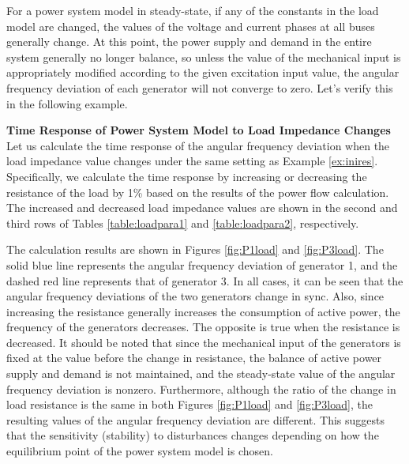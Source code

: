 \documentclass[graybox, envcountchap]{svmult}
\begin{document}
For a power system model in steady-state, if any of the constants in the load
model are changed, the values of the voltage and current phases at all buses
generally change. At this point, the power supply and demand in the entire
system generally no longer balance, so unless the value of the mechanical input
is appropriately modified according to the given excitation input value, the
angular frequency deviation of each generator will not converge to zero. Let's
verify this in the following example.

\begin{example}{\textbf{Time Response of Power System Model to Load Impedance Changes}}\label{ex:loadpv}
Let us calculate the time response of the angular frequency deviation when the
load impedance value changes under the same setting as Example \ref{ex:inires}.
Specifically, we calculate the time response by increasing or decreasing
the resistance of the load by 1\% based on the results of the power flow
calculation. The increased and decreased load impedance values are shown in the
second and third rows of Tables \ref{table:loadpara1} and \ref{table:loadpara2},
respectively.

The calculation results are shown in Figures \ref{fig:P1load} and
\ref{fig:P3load}. The solid blue line represents the angular frequency
deviation of generator 1, and the dashed red line represents that of generator
3. In all cases, it can be seen that the angular frequency deviations of the two
generators change in sync. Also, since increasing the resistance generally
increases the consumption of active power, the frequency of the generators
decreases. The opposite is true when the resistance is decreased. It should be
noted that since the mechanical input of the generators is fixed at the value
before the change in resistance, the balance of active power supply and demand
is not maintained, and the steady-state value of the angular frequency deviation
is nonzero. Furthermore, although the ratio of the change in load resistance is
the same in both Figures \ref{fig:P1load} and \ref{fig:P3load}, the resulting
values of the angular frequency deviation are different. This suggests that the
sensitivity (stability) to disturbances changes depending on how the equilibrium
point of the power system model is chosen.

\end{example}
\end{document}
